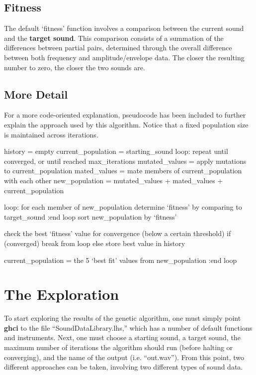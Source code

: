\documentclass[11pt]{article}
\begin{document}
\subsection{Fitness}

The default `fitness' function involves a comparison between the current sound and the {\bf target sound}. This comparison consists of a summation of the differences between partial pairs, determined through the overall difference between both frequency and amplitude/envelope data. The closer the resulting number to zero, the closer the two sounds are.

\subsection{More Detail}

For a more code-oriented explanation, pseudocode has been included to further explain the approach used by this algorithm. Notice that a fixed population size is maintained across iterations.

\begin{code}
history = empty
current_population = starting_sound
loop: repeat until converged, or until reached max_iterations
  mutated_values = apply mutations to current_population
  mated_values   = mate members of current_population with each other
  new_population = mutated_values + mated_values + current_population
  
  loop: for each member of new_population
    determine `fitness' by comparing to target_sound
  :end loop
  sort new_population by `fitness'
  
  check the best `fitness' value for convergence (below a certain threshold)
  if (converged)
    break from loop
  else
    store best value in history
  
  current_population = the 5 `best fit' values from new_population
:end loop
\end{code}
 
\section{The Exploration}

To start exploring the results of the genetic algorithm, one must simply point {\bf ghci} to the file ``SoundDataLibrary.lhs,'' which has a number of default functions and instruments. Next, one must choose a starting sound, a target sound, the maximum number of iterations the algorithm should run (before halting or converging), and the name of the output (i.e. ``out.wav''). 
From this point, two different approaches can be taken, involving two different types of sound data.
\end{document}
